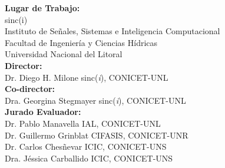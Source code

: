 {\large \noindent \textbf{Lugar de Trabajo:}\\
\vspace{1em}sinc(i)\\
Instituto de Señales, Sistemas e Inteligencia Computacional\\
Facultad de Ingeniería y Ciencias Hídricas\\
Universidad Nacional del Litoral\\[0.5cm]

\noindent\textbf{Director:}\\
Dr. Diego H. Milone\hspace{13.2em} sinc(\textit{i}), CONICET-UNL\\[0.4cm]
\noindent\textbf{Co-director:}\\
Dra. Georgina Stegmayer\hspace{11em} sinc(\textit{i}), CONICET-UNL\\[0.4cm]

\noindent\textbf{Jurado Evaluador:}\\[0.3cm]
Dr. Pablo Manavella\hspace{13.1em} IAL, CONICET-UNL\\[0.1cm]
Dr. Guillermo Grinblat\hspace{12em} CIFASIS, CONICET-UNR\\[0.1cm]
Dr. Carlos Chesñevar\hspace{12.8em} ICIC, CONICET-UNS\\[0.1cm]
Dra. Jéssica Carballido\hspace{12.1em} ICIC, CONICET-UNS\\[0.1cm]
}
